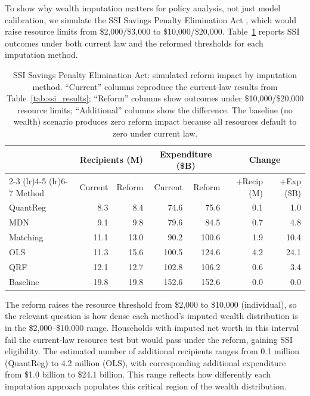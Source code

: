 To show why wealth imputation matters for policy analysis, not just model calibration, we simulate the SSI Savings Penalty Elimination Act \citep{ssi_spea_2025}, which would raise resource limits from \$2,000/\$3,000 to \$10,000/\$20,000. Table~\ref{tab:ssi_reform} reports SSI outcomes under both current law and the reformed thresholds for each imputation method.

\begin{table}[H]
    \centering
    \caption{SSI Savings Penalty Elimination Act: simulated reform impact by imputation method. ``Current'' columns reproduce the current-law results from Table~\ref{tab:ssi_results}; ``Reform'' columns show outcomes under \$10,000/\$20,000 resource limits; ``Additional'' columns show the difference. The baseline (no wealth) scenario produces zero reform impact because all resources default to zero under current law.}
    \label{tab:ssi_reform}
    \begin{tabular}{lrrrrrr}
        \toprule
        & \multicolumn{2}{c}{Recipients (M)} & \multicolumn{2}{c}{Expenditure (\$B)} & \multicolumn{2}{c}{Change} \\
        \cmidrule(lr){2-3} \cmidrule(lr){4-5} \cmidrule(lr){6-7}
        Method & Current & Reform & Current & Reform & +Recip (M) & +Exp (\$B) \\
        \midrule
        QuantReg & 8.3 & 8.4 & 74.6 & 75.6 & 0.1 & 1.0 \\
        MDN & 9.1 & 9.8 & 79.6 & 84.5 & 0.7 & 4.8 \\
        Matching & 11.1 & 13.0 & 90.2 & 100.6 & 1.9 & 10.4 \\
        OLS & 11.3 & 15.6 & 100.5 & 124.6 & 4.2 & 24.1 \\
        QRF & 12.1 & 12.7 & 102.8 & 106.2 & 0.6 & 3.4 \\
        \midrule
        Baseline & 19.8 & 19.8 & 152.6 & 152.6 & 0.0 & 0.0 \\
        \bottomrule
    \end{tabular}
\end{table}

The reform raises the resource threshold from \$2,000 to \$10,000 (individual), so the relevant question is how dense each method's imputed wealth distribution is in the \$2,000--\$10,000 range. Households with imputed net worth in this interval fail the current-law resource test but would pass under the reform, gaining SSI eligibility. The estimated number of additional recipients ranges from 0.1 million (QuantReg) to 4.2 million (OLS), with corresponding additional expenditure from \$1.0 billion to \$24.1 billion. This range reflects how differently each imputation approach populates this critical region of the wealth distribution.

